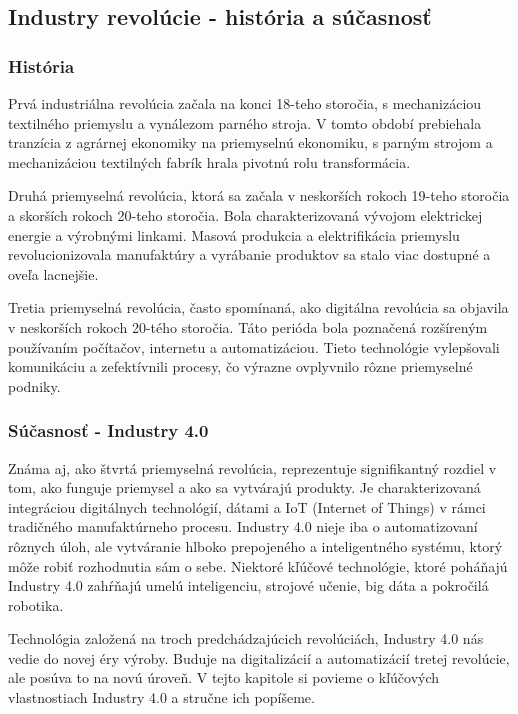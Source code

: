 \subsection{Industry revolúcie - história a súčasnosť}

\subsubsection{História}

Prvá industriálna revolúcia začala na konci 18-teho storočia, s mechanizáciou textilného priemyslu a vynálezom parného stroja. V tomto období prebiehala tranzícia z agrárnej ekonomiky na priemyselnú ekonomiku, s parným strojom a mechanizáciou textilných fabrík hrala pivotnú rolu transformácia.

Druhá priemyselná revolúcia, ktorá sa začala v neskorších rokoch 19-teho storočia a skorších rokoch 20-teho storočia. Bola charakterizovaná vývojom elektrickej energie a výrobnými linkami. Masová produkcia a elektrifikácia priemyslu revolucionizovala manufaktúry a vyrábanie produktov sa stalo viac dostupné a oveľa lacnejšie.

Tretia priemyselná revolúcia, často spomínaná, ako digitálna revolúcia sa objavila v neskorších rokoch 20-tého storočia. Táto perióda bola poznačená rozšíreným používaním počítačov, internetu a automatizáciou. Tieto technológie vylepšovali komunikáciu a zefektívnili procesy, čo výrazne ovplyvnilo rôzne priemyselné podniky. \cite{rajan2023industry40}

\subsubsection{Súčasnosť - Industry 4.0}

Známa aj, ako štvrtá priemyselná revolúcia, reprezentuje signifikantný rozdiel v tom, ako funguje priemysel a ako sa vytvárajú produkty. Je charakterizovaná integráciou digitálnych technológií, dátami a IoT (Internet of Things) v rámci tradičného manufaktúrneho procesu. Industry 4.0 nieje iba o automatizovaní rôznych úloh, ale vytváranie hlboko prepojeného a inteligentného systému, ktorý môže robiť rozhodnutia sám o sebe. Niektoré kľúčové technológie, ktoré poháňajú Industry 4.0 zahŕňajú umelú inteligenciu, strojové učenie, big dáta a pokročilá robotika. \cite{rajan2023industry40}

Technológia založená na troch predchádzajúcich revolúciách, Industry 4.0 nás vedie do novej éry výroby. Buduje na digitalizácií a automatizácií tretej revolúcie, ale posúva to na novú úroveň. V tejto kapitole si povieme o kľúčových vlastnostiach Industry 4.0 a stručne ich popíšeme.

